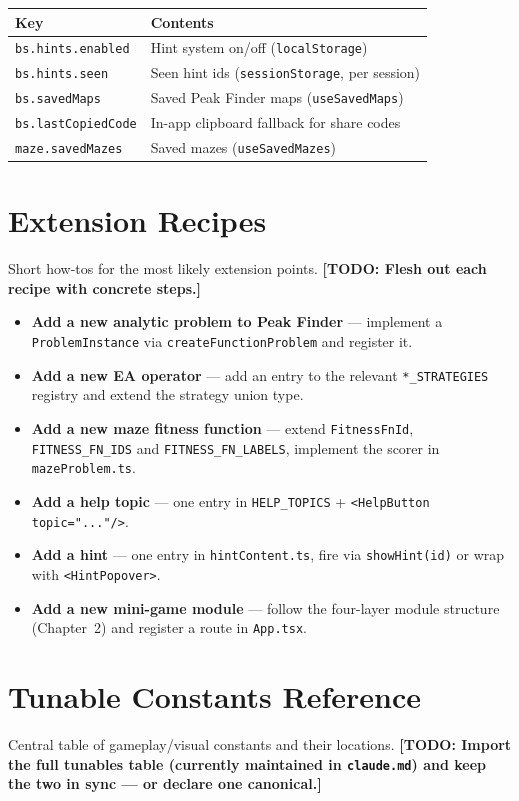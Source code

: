 \documentclass[11pt,a4paper]{report}
\newcommand{\todo}[1]{\textcolor{red!70!black}{\textbf{[TODO: #1]}}}
\newcommand{\srcfile}[1]{\texttt{\small #1}}   %
\newcommand{\ts}[1]{\texttt{#1}}               %
\begin{document}
\begin{center}
\begin{tabularx}{\textwidth}{l X}
  \toprule
  \textbf{Key} & \textbf{Contents} \\
  \midrule
  \ts{bs.hints.enabled} & Hint system on/off (\ts{localStorage}) \\
  \ts{bs.hints.seen}    & Seen hint ids (\ts{sessionStorage}, per session) \\
  \ts{bs.savedMaps}     & Saved Peak Finder maps (\ts{useSavedMaps}) \\
  \ts{bs.lastCopiedCode}& In-app clipboard fallback for share codes \\
  \ts{maze.savedMazes}  & Saved mazes (\ts{useSavedMazes}) \\
  \bottomrule
\end{tabularx}
\end{center}

\appendix

\chapter{Extension Recipes}

Short how-tos for the most likely extension points.
\todo{Flesh out each recipe with concrete steps.}

\begin{itemize}
  \item \textbf{Add a new analytic problem to Peak Finder} --- implement a
        \ts{ProblemInstance} via \ts{createFunctionProblem} and register it.
  \item \textbf{Add a new EA operator} --- add an entry to the relevant
        \ts{*\_STRATEGIES} registry and extend the strategy union type.
  \item \textbf{Add a new maze fitness function} --- extend
        \ts{FitnessFnId}, \ts{FITNESS\_FN\_IDS} and \ts{FITNESS\_FN\_LABELS},
        implement the scorer in \ts{mazeProblem.ts}.
  \item \textbf{Add a help topic} --- one entry in \ts{HELP\_TOPICS} +
        \ts{<HelpButton topic="..."/>}.
  \item \textbf{Add a hint} --- one entry in \ts{hintContent.ts}, fire via
        \ts{showHint(id)} or wrap with \ts{<HintPopover>}.
  \item \textbf{Add a new mini-game module} --- follow the four-layer module
        structure (Chapter~2) and register a route in \srcfile{App.tsx}.
\end{itemize}

\chapter{Tunable Constants Reference}

Central table of gameplay/visual constants and their locations.
\todo{Import the full tunables table (currently maintained in
\srcfile{claude.md}) and keep the two in sync — or declare one canonical.}
\end{document}
